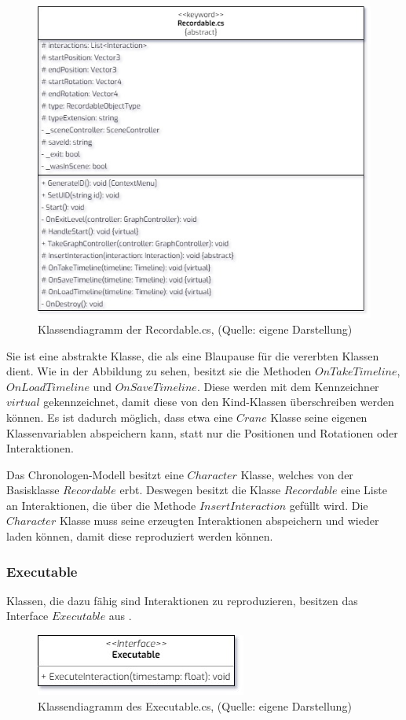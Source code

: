 \begin{figure}[ht]
\centering
\includegraphics[width=0.6\linewidth]{content/pictures/Recordable.jpg}
\caption{Klassendiagramm der Recordable.cs, (Quelle: eigene Darstellung)}
\label{fig:recordable-cs}
\end{figure}

Sie ist eine abstrakte Klasse, die als eine Blaupause für die vererbten Klassen dient. Wie in der Abbildung zu sehen, besitzt sie die Methoden $OnTakeTimeline$, \\ $OnLoadTimeline$ und $OnSaveTimeline$. Diese werden mit dem Kennzeichner $virtual$ gekennzeichnet, damit diese von den Kind-Klassen überschreiben werden können. Es ist dadurch möglich, dass etwa eine $Crane$ Klasse seine eigenen Klassenvariablen abspeichern kann, statt nur die Positionen und Rotationen oder Interaktionen.

Das Chronologen-Modell besitzt eine $Character$ Klasse, welches von der Basisklasse $Recordable$ erbt. Deswegen besitzt die Klasse $Recordable$ eine Liste an Interaktionen, die über die Methode $InsertInteraction$ gefüllt wird. Die $Character$ Klasse muss seine erzeugten Interaktionen abspeichern und wieder laden können, damit diese reproduziert werden können.
\newpage
\subsubsection{Executable}
Klassen, die dazu fähig sind Interaktionen zu reproduzieren, besitzen das Interface $Executable$ aus .

\begin{figure}[ht]
\centering
\includegraphics[width=0.4\linewidth]{content/pictures/Executable.jpg}
\caption{Klassendiagramm des Executable.cs, (Quelle: eigene Darstellung)}
\label{fig:executable-cs}
\end{figure}

